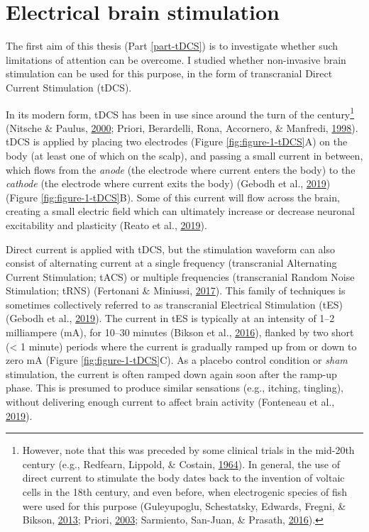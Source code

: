 \documentclass[12pt,a4paper,]{memoir}
\let\rmarkdownfootnote\footnote%
\def\footnote{\protect\rmarkdownfootnote}
\begin{document}
\hypertarget{electrical-brain-stimulation}{%
\section{Electrical brain stimulation}\label{electrical-brain-stimulation}}

The first aim of this thesis (Part \ref{part-tDCS}) is to investigate whether such limitations of attention can be overcome. I studied whether non-invasive brain stimulation can be used for this purpose, in the form of transcranial Direct Current Stimulation (tDCS).

In its modern form, tDCS has been in use since around the turn of the century\footnote{However, note that this was preceded by some clinical trials in the mid-20th century (e.g., Redfearn, Lippold, \& Costain, \protect\hyperlink{ref-Redfearn1964}{1964}). In general, the use of direct current to stimulate the body dates back to the invention of voltaic cells in the 18th century, and even before, when electrogenic species of fish were used for this purpose (Guleyupoglu, Schestatsky, Edwards, Fregni, \& Bikson, \protect\hyperlink{ref-Guleyupoglu2013}{2013}; Priori, \protect\hyperlink{ref-Priori2003}{2003}; Sarmiento, San-Juan, \& Prasath, \protect\hyperlink{ref-Sarmiento2016}{2016}).} (Nitsche \& Paulus, \protect\hyperlink{ref-Nitsche2000}{2000}; Priori, Berardelli, Rona, Accornero, \& Manfredi, \protect\hyperlink{ref-Priori1998}{1998}). tDCS is applied by placing two electrodes (Figure \ref{fig:figure-1-tDCS}A) on the body (at least one of which on the scalp), and passing a small current in between, which flows from the \emph{anode} (the electrode where current enters the body) to the \emph{cathode} (the electrode where current exits the body) (Gebodh et al., \protect\hyperlink{ref-Gebodh2019a}{2019}) (Figure \ref{fig:figure-1-tDCS}B). Some of this current will flow across the brain, creating a small electric field which can ultimately increase or decrease neuronal excitability and plasticity (Reato et al., \protect\hyperlink{ref-Reato2019}{2019}).

Direct current is applied with tDCS, but the stimulation waveform can also consist of alternating current at a single frequency (transcranial Alternating Current Stimulation; tACS) or multiple frequencies (transcranial Random Noise Stimulation; tRNS) (Fertonani \& Miniussi, \protect\hyperlink{ref-Fertonani2017}{2017}). This family of techniques is sometimes collectively referred to as transcranial Electrical Stimulation (tES) (Gebodh et al., \protect\hyperlink{ref-Gebodh2019a}{2019}). The current in tES is typically at an intensity of 1--2 milliampere (mA), for 10--30 minutes (Bikson et al., \protect\hyperlink{ref-Bikson2016}{2016}), flanked by two short (\textless{} 1 minute) periods where the current is gradually ramped up from or down to zero mA (Figure \ref{fig:figure-1-tDCS}C). As a placebo control condition or \emph{sham} stimulation, the current is often ramped down again soon after the ramp-up phase. This is presumed to produce similar sensations (e.g., itching, tingling), without delivering enough current to affect brain activity (Fonteneau et al., \protect\hyperlink{ref-Fonteneau2019}{2019}).
\end{document}
